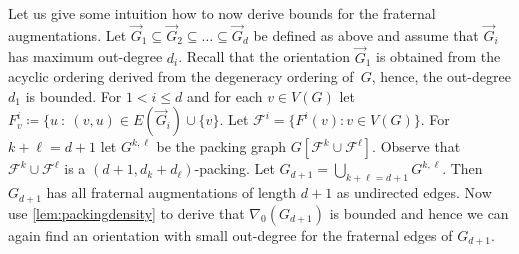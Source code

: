 \documentclass[1p,number,a4paper]{elsarticle}
\theoremstyle{remark}
\newcommand{\Ff}{\mathcal{F}}
\newtheorem{definition}[theorem]{Definition}
\newtheorem{lemma}[theorem]{Lemma}
\begin{document}
\medskip

%



Let us give some intuition how to now derive bounds for the fraternal augmentations. 
Let $\vec{G}_1\subseteq \vec{G}_2\subseteq \ldots\subseteq 
\vec{G}_d$ be defined as above and assume that $\vec{G}_i$ has
maximum out-degree $d_i$. Recall that the orientation $\vec G_1$ is obtained from the acyclic ordering derived from the degeneracy ordering of~$G$, hence, the out-degree $d_1$ is bounded.  
For $1<i\leq d$ and for each $v\in V(G)$
let $F^i_v\coloneqq \{u~:~(v,u)\in E(\vec G_i)\cup \{v\}$. 
Let $\Ff^i=\{F^i(v) : v\in V(G)\}$. For $k+\ell = d+1$ let 
$G^{k,\ell}$ be the packing graph $G[\Ff^k\cup \Ff^\ell]$. 
Observe that $\Ff^k\cup \Ff^\ell$ is a $(d+1, d_k+d_\ell)$-packing. 
Let $G_{d+1}=\bigcup_{k+\ell=d+1}G^{k,\ell}$. 
Then $G_{d+1}$ has
all fraternal augmentations of length $d+1$ as undirected edges. 
Now use \cref{lem:packingdensity} to derive that $\nabla_0(G_{d+1})$ is bounded and hence we can again find an orientation with small out-degree for the fraternal edges of $G_{d+1}$. 
\end{document}
